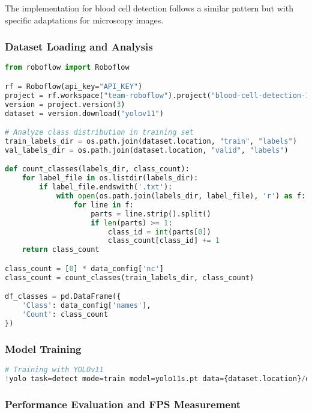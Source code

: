 The implementation for blood cell detection follows a similar pattern but with specific adaptations for microscopy images.

\subsubsection{Dataset Loading and Analysis}

\begin{lstlisting}[language=Python, caption={Blood Cell Dataset Analysis}, label={lst:blood-dataset}]
from roboflow import Roboflow

rf = Roboflow(api_key="API_KEY")
project = rf.workspace("team-roboflow").project("blood-cell-detection-1ekwu")
version = project.version(3)
dataset = version.download("yolov11")

# Analyze class distribution in training set
train_labels_dir = os.path.join(dataset.location, "train", "labels")
val_labels_dir = os.path.join(dataset.location, "valid", "labels")

def count_classes(labels_dir, class_count):
    for label_file in os.listdir(labels_dir):
        if label_file.endswith('.txt'):
            with open(os.path.join(labels_dir, label_file), 'r') as f:
                for line in f:
                    parts = line.strip().split()
                    if len(parts) >= 1:
                        class_id = int(parts[0])
                        class_count[class_id] += 1
    return class_count

class_count = [0] * data_config['nc']
class_count = count_classes(train_labels_dir, class_count)

df_classes = pd.DataFrame({
    'Class': data_config['names'],
    'Count': class_count
})
\end{lstlisting}

\subsubsection{Model Training}

\begin{lstlisting}[language=Python, caption={Blood Cell Detection Model Training}, label={lst:blood-train}]
# Training with YOLOv11
!yolo task=detect mode=train model=yolo11s.pt data={dataset.location}/data.yaml epochs=80 imgsz=640 plots=True patience=15 save_period=10
\end{lstlisting}

\subsubsection{Performance Evaluation and FPS Measurement}

